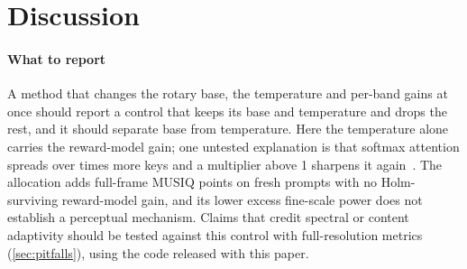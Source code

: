 \section{Discussion}\label{sec:discussion}

\paragraph{What to report}
A method that changes the rotary base, the temperature and per-band gains at once should report a control that keeps its base and temperature and drops the rest, and it should separate base from temperature. Here the temperature alone carries the reward-model gain; one untested explanation is that softmax attention spreads over  times more keys and a multiplier above 1 sharpens it again~\citep{jin2023training}. The allocation adds   full-frame MUSIQ points on fresh prompts with no Holm-surviving reward-model gain, and its lower excess fine-scale power does not establish a perceptual mechanism. Claims that credit spectral or content adaptivity should be tested against this control with full-resolution metrics (\cref{sec:pitfalls}), using the code released with this paper.
